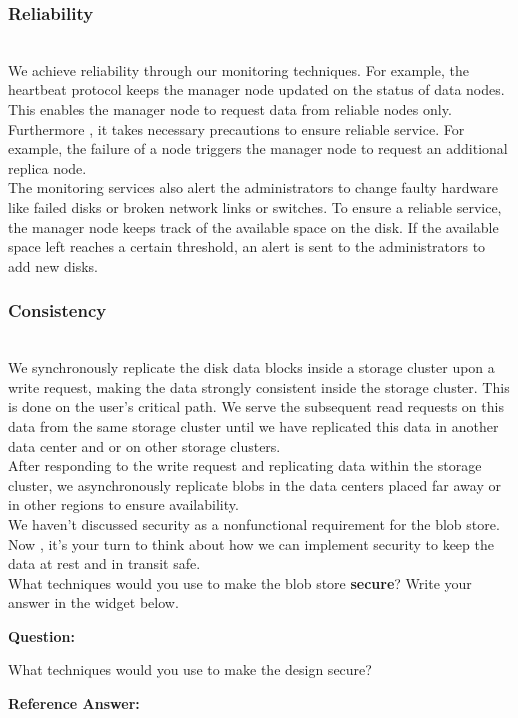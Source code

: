 \subsubsection{Reliability}\label{YkP6gdpI_pqaLNETn_YNW}
\\
We achieve reliability through our monitoring techniques. For example, the heartbeat protocol keeps the manager node updated on the status of data nodes. This enables the manager node to request data from reliable nodes only. Furthermore , it takes necessary precautions to ensure reliable service. For example, the failure of a node triggers the manager node to request an additional replica node.
\\
The monitoring services also alert the administrators to change faulty hardware like failed disks or broken network links or switches. To ensure a reliable service, the manager node keeps track of the available space on the disk. If the available space left reaches a certain threshold, an alert is sent to the administrators to add new disks.

\subsubsection{Consistency}\label{1IXXcT47ZNOkW2jGAvP2W}
\\
We synchronously replicate the disk data blocks inside a storage cluster upon a write request, making the data strongly consistent inside the storage cluster. This is done on the user's critical path. We serve the subsequent read requests on this data from the same storage cluster until we have replicated this data in another data center and or on other storage clusters.
\\
After responding to the write request and replicating data within the storage cluster, we asynchronously replicate blobs in the data centers placed far away or in other regions to ensure availability.
\\
We haven't discussed security as a nonfunctional requirement for the blob store. Now , it's your turn to think about how we can implement security to keep the data at rest and in transit safe.
\\
What techniques would you use to make the blob store \textbf{secure}? Write your answer in the widget below.

\textbf{Question:}

What techniques would you use to make the design secure?

\textbf{Reference Answer:}

